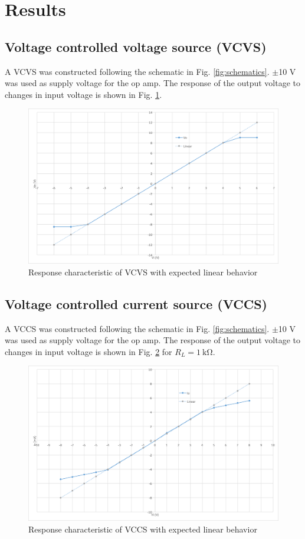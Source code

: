\section{Results}\label{sec:results}
\subsection{Voltage controlled voltage source (VCVS)}\label{sec:vcvs}
A VCVS was constructed following the schematic in Fig. \ref{fig:schematics}. 
$\pm$10 V was used as supply voltage for the op amp.
The response of the output voltage to changes in input voltage is shown in Fig. \ref{fig:vcvs-graph}.

\begin{figure}[htpb]
	\centering
	\includegraphics[width=0.95\linewidth]{graphics/vcvs-graph}
	\caption{Response characteristic of VCVS with expected linear behavior}
	\label{fig:vcvs-graph}
\end{figure}

\subsection{Voltage controlled current source (VCCS)}\label{sec:vccs}
A VCCS was constructed following the schematic in Fig. \ref{fig:schematics}.
$\pm$10 V was used as supply voltage for the op amp.
The response of the output voltage to changes in input voltage is shown in Fig. \ref{fig:vccs-graph} for $R_L = \SI{1}{\kilo\ohm}$.

\begin{figure}[tbph]
	\centering
	\includegraphics[width=0.95\linewidth]{graphics/vccs-graph}
	\caption{Response characteristic of VCCS with expected linear behavior}
	\label{fig:vccs-graph}
\end{figure}
